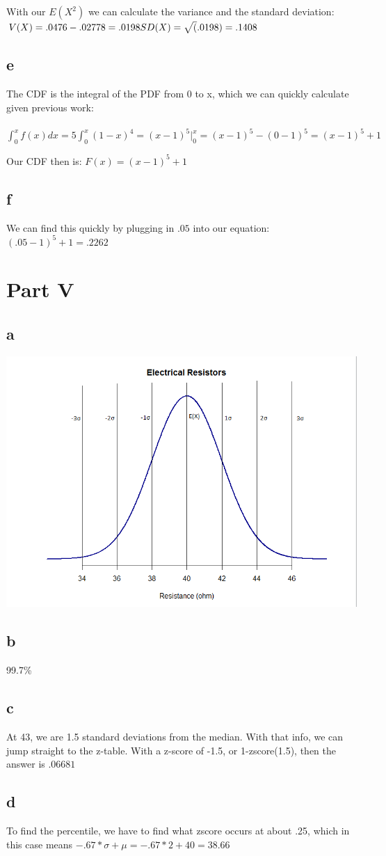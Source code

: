 \documentclass[10pt,letterpaper]{article}
\begin{document}
With our $E(X^2)$ we can calculate the variance and the standard deviation:\\

\noindent$V(X) = .0476-.02778 = .0198\\\\
SD(X) = \sqrt(.0198) = .1408$

\subsection*{e}
The CDF is the integral of the PDF from 0 to x, which we can quickly calculate
given previous work:\\\\
$\int_{0}^{x}f(x)dx = 5\int_{0}^{x}(1-x)^4 = (x-1)^5\big|_0^x = (x-1)^5 - (0-1)^5 = (x-1)^5+1$

Our CDF then is: $F(x)=(x-1)^5+1$

\subsection*{f}
We can find this quickly by plugging in $.05$ into our equation:\\
$(.05-1)^5+1=.2262$

\section*{Part V}
\subsection*{a}
\includegraphics[scale=.75]{elecDIST}
\subsection*{b}
99.7\%
\subsection*{c}
At 43, we are 1.5 standard deviations from the median. With that info, we can
jump straight to the z-table. With a z-score of -1.5, or 1-zscore(1.5), then the
answer is $.06681$
\subsection*{d}
To find the percentile, we have to find what zscore occurs at about .25, which
in this case means $-.67*\sigma+\mu=-.67*2+40=38.66$
\end{document}

